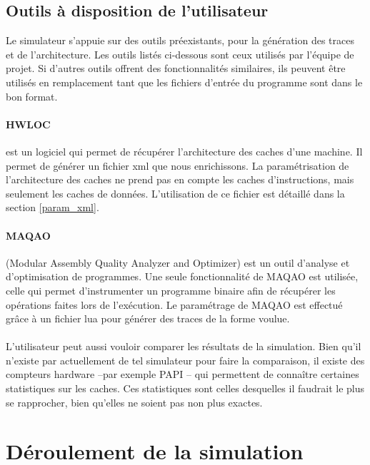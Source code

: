 \subsection{Outils à disposition de l'utilisateur}

Le simulateur s'appuie sur des outils préexistants, pour la génération des traces et de l'architecture. Les outils listés ci-dessous sont ceux utilisés par l'équipe de projet. Si d'autres outils offrent des fonctionnalités similaires, ils peuvent être utilisés en remplacement tant que les fichiers d'entrée du programme sont dans le bon format.

\paragraph{HWLOC} est un logiciel qui permet de récupérer l'architecture des caches d'une machine. Il permet de générer un fichier xml que nous enrichissons. La paramétrisation de l'architecture des caches ne prend pas en compte les caches d'instructions, mais seulement les caches de données. L'utilisation de ce fichier est détaillé dans la section \ref{param_xml}.

\paragraph{MAQAO} (Modular Assembly Quality Analyzer and Optimizer) est un outil d'analyse et d'optimisation de programmes. Une seule fonctionnalité de \textsf{MAQAO} est utilisée, celle qui permet d'instrumenter un programme binaire afin de récupérer les opérations faites lors de l'exécution. Le paramétrage de \textsf{MAQAO} est effectué grâce à un fichier lua pour générer des traces de la forme voulue.

\paragraph{}
L'utilisateur peut aussi vouloir comparer les résultats de la simulation. Bien qu'il n'existe par actuellement de tel simulateur pour faire la comparaison, il existe des compteurs hardware --par exemple \textsf{PAPI} -- qui permettent de connaître certaines statistiques sur les caches. Ces statistiques sont celles desquelles il faudrait le plus se rapprocher, bien qu'elles ne soient pas non plus exactes.


\section{Déroulement de la simulation}

